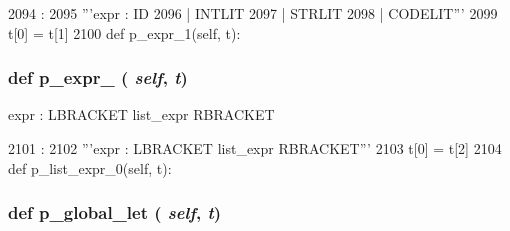 \begin{DoxyCode}
2094                          :
2095         '''expr : ID
2096                 | INTLIT
2097                 | STRLIT
2098                 | CODELIT'''
2099         t[0] = t[1]
2100 
    def p_expr_1(self, t):
\end{DoxyCode}
\hypertarget{classisa__parser_1_1ISAParser_a57d960b34ec99ff885af4e58f0400444}{
\subsubsection[{p\_\-expr\_\-1}]{\setlength{\rightskip}{0pt plus 5cm}def p\_\-expr\_ ( {\em self}, \/   {\em t})}}
\label{classisa__parser_1_1ISAParser_a57d960b34ec99ff885af4e58f0400444}
\begin{DoxyVerb}expr : LBRACKET list_expr RBRACKET\end{DoxyVerb}
 


\begin{DoxyCode}
2101                          :
2102         '''expr : LBRACKET list_expr RBRACKET'''
2103         t[0] = t[2]
2104 
    def p_list_expr_0(self, t):
\end{DoxyCode}
\hypertarget{classisa__parser_1_1ISAParser_a29a462b6dec44ad37ff080fa27bda345}{
\subsubsection[{p\_\-global\_\-let}]{\setlength{\rightskip}{0pt plus 5cm}def p\_\-global\_\-let ( {\em self}, \/   {\em t})}}
\label{classisa__parser_1_1ISAParser_a29a462b6dec44ad37ff080fa27bda345}



